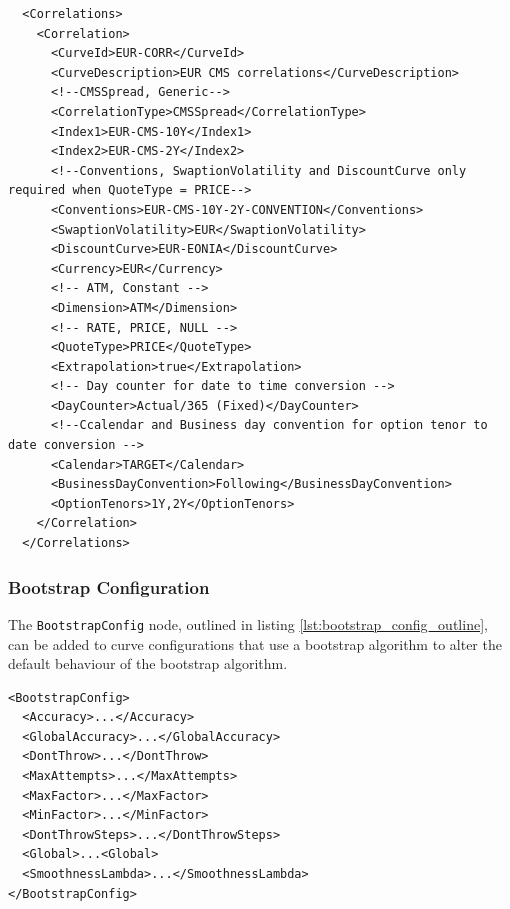 \begin{longlisting}
\begin{verbatim}
  <Correlations>
    <Correlation>
      <CurveId>EUR-CORR</CurveId>
      <CurveDescription>EUR CMS correlations</CurveDescription>
      <!--CMSSpread, Generic-->
      <CorrelationType>CMSSpread</CorrelationType>
      <Index1>EUR-CMS-10Y</Index1>
      <Index2>EUR-CMS-2Y</Index2>
      <!--Conventions, SwaptionVolatility and DiscountCurve only required when QuoteType = PRICE-->
      <Conventions>EUR-CMS-10Y-2Y-CONVENTION</Conventions>
      <SwaptionVolatility>EUR</SwaptionVolatility>
      <DiscountCurve>EUR-EONIA</DiscountCurve>
      <Currency>EUR</Currency>
      <!-- ATM, Constant -->
      <Dimension>ATM</Dimension>
      <!-- RATE, PRICE, NULL -->
      <QuoteType>PRICE</QuoteType>
      <Extrapolation>true</Extrapolation>
      <!-- Day counter for date to time conversion -->
      <DayCounter>Actual/365 (Fixed)</DayCounter>
      <!--Ccalendar and Business day convention for option tenor to date conversion -->
      <Calendar>TARGET</Calendar>
      <BusinessDayConvention>Following</BusinessDayConvention>
      <OptionTenors>1Y,2Y</OptionTenors>
    </Correlation>
  </Correlations>\end{verbatim}
\caption{Correlation Configuration}
\label{lst:correlation_configuration}
\end{longlisting}







\subsubsection{Bootstrap Configuration}
\label{sec:bootstrap_config}
The \lstinline!BootstrapConfig! node, outlined in listing \ref{lst:bootstrap_config_outline}, can be added to curve configurations that use a bootstrap algorithm to alter the default behaviour of the bootstrap algorithm.

\begin{longlisting}
\begin{verbatim}
<BootstrapConfig>
  <Accuracy>...</Accuracy>
  <GlobalAccuracy>...</GlobalAccuracy>
  <DontThrow>...</DontThrow>
  <MaxAttempts>...</MaxAttempts>
  <MaxFactor>...</MaxFactor>
  <MinFactor>...</MinFactor>
  <DontThrowSteps>...</DontThrowSteps>
  <Global>...<Global>
  <SmoothnessLambda>...</SmoothnessLambda>
</BootstrapConfig>
\end{verbatim}
\caption{\lstinline!BootstrapConfig! node outline}
\label{lst:bootstrap_config_outline}
\end{longlisting}

